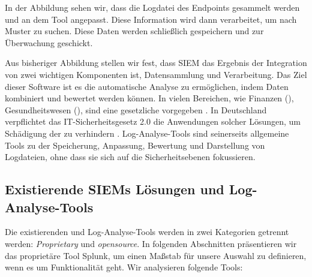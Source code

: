 In der Abbildung sehen wir, dass die Logdatei des \gls{Endpoint}s gesammelt werden und an dem Tool angepasst. Diese Information wird dann verarbeitet, um nach Muster zu suchen. Diese Daten werden schließlich gespeichern und zur Überwachung geschickt.





Aus bisheriger Abbildung stellen wir fest, dass \gls{SIEM} das Ergebnis der Integration von zwei wichtigen Komponenten ist, Datensammlung und Verarbeitung. Das Ziel dieser Software ist es die automatische Analyse zu ermöglichen, indem Daten kombiniert und bewertet werden können. In vielen Bereichen, wie Finanzen (), Gesundheitswesen (), sind  eine gesetzliche vorgegeben \citep{Jog_SIEM}. In Deutschland verpflichtet das \gls{IT-Sicherheitsgesetz 2.0} die Anwendungen solcher Lösungen, um Schädigung der  zu verhindern \citep{BSI_ITSG}. Log-Analyse-Tools sind seinerseits allgemeine Tools zu der Speicherung, Anpassung, Bewertung und Darstellung von Logdateien, ohne dass sie sich auf die Sicherheitsebenen fokussieren.


\subsection{Existierende SIEMs Lösungen und Log-Analyse-Tools}
Die existierenden  und Log-Analyse-Tools werden in zwei Kategorien getrennt werden: \textit{\gls{Proprietary}} und  \textit{\gls{opensource}}. In folgenden Abschnitten präsentieren wir das proprietäre Tool Splunk, um einen Maßstab für unsere Auswahl zu definieren, wenn es um Funktionalität geht. Wir analysieren folgende Tools: %

